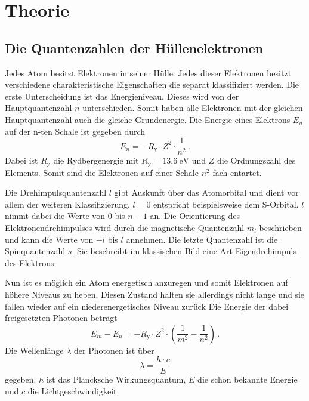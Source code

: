 \section{Theorie}
\label{sec:Theorie}

\subsection{Die Quantenzahlen der Hüllenelektronen}
\label{ssec:theo1}

Jedes Atom besitzt Elektronen in seiner Hülle. Jedes dieser Elektronen besitzt verschiedene charakteristische Eigenschaften die separat klassifiziert werden. 
Die erste Unterscheidung ist das Energieniveau. Dieses wird von der Hauptquantenzahl $n$ unterschieden.
Somit haben alle Elektronen mit der gleichen Hauptquantenzahl auch die gleiche Grundenergie.
Die Energie eines Elektrons $E_n$ auf der n-ten Schale ist gegeben durch
\begin{equation}
    E_n = - R_\text{y} \cdot Z^2 \cdot \frac{1}{n^2} \, .
    \label{eq:n}
\end{equation}
Dabei ist $R_\text{y}$ die Rydbergenergie mit $ R_\text{y} = \SI{13.6}{\electronvolt}$ und $Z$ die Ordnungszahl des Elements.
Somit sind die Elektronen auf einer Schale $n^2$-fach entartet.

Die Drehimpulsquantenzahl $l$ gibt Auskunft über das Atomorbital und dient vor allem der weiteren Klassifizierung.
$l = 0$ entspricht beispielsweise dem S-Orbital.
$l$ nimmt dabei die Werte von $0$ bis $ n - 1 $ an. 
Die Orientierung des Elektronendrehimpulses wird durch die magnetische Quantenzahl $m_l$ beschrieben und kann die Werte von $- l $ bis $ l $ annehmen.
Die letzte Quantenzahl ist die Spinquantenzahl $s$. 
Sie beschreibt im klassischen Bild eine Art Eigendrehimpuls des Elektrons.

Nun ist es möglich ein Atom energetisch anzuregen und somit Elektronen auf höhere Niveaus zu heben.
Diesen Zustand halten sie allerdings nicht lange und sie fallen wieder auf ein niederenergetisches Niveau zurück
Die Energie der dabei freigesetzten Photonen beträgt 
\begin{equation}
    E_m - E_n = - R_\text{y} \cdot Z^2 \cdot \left( \frac{1}{m^2} - \frac{1}{n^2} \right) \, .
    \label{eq:energiediff}
\end{equation}
Die Wellenlänge $\lambda$ der Photonen ist über
\begin{equation}
     \lambda = \frac{h \cdot c}{E}
    \label{eq:wellenl}
\end{equation}
gegeben. $h$ ist das Plancksche Wirkungsquantum, $E$ die schon bekannte Energie und $c$ die Lichtgeschwindigkeit.


